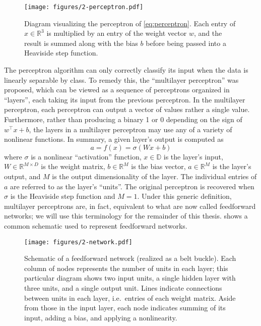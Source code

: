\begin{figure}
  \centering
  \texttt{[image: figures/2-perceptron.pdf]}
  \caption[Visualization of a perceptron]{Diagram visualizing the perceptron of \cref{eq:perceptron}.
  Each entry of $x \in \mathbb{R}^3$ is multiplied by an entry of the weight vector $w$, and the result is summed along with the bias $b$ before being passed into a Heaviside step function.}
  \label{fig:perceptron}
\end{figure}

The perceptron algorithm can only correctly classify its input when the data is linearly separable by class.
To remedy this, the ``multilayer perceptron'' was proposed, which can be viewed as a sequence of perceptrons organized in ``layers'', each taking its input from the previous perceptron.
In the multilayer perceptron, each perceptron can output a vector of values rather a single value.
Furthermore, rather than producing a binary 1 or 0 depending on the sign of $w^\top x + b$, the layers in a multilayer perceptron may use any of a variety of nonlinear functions.
In summary, a given layer's output is computed as
\begin{equation}
        a = f(x) = \sigma(W x + b)
\end{equation}
where $\sigma$ is a nonlinear ``activation'' function, $x \in \mathbb{D}$ is the layer's input, $W \in \mathbb{R}^{M \times D}$ is the weight matrix, $b \in \mathbb{R}^M$ is the bias vector, $a \in \mathbb{R}^M$ is the layer's output, and $M$ is the output dimensionality of the layer.
The individual entries of $a$ are referred to as the layer's ``units''.
The original perceptron is recovered when $\sigma$ is the Heaviside step function and $M = 1$.
Under this generic definition, multilayer perceptrons are, in fact, equivalent to what are now called feedforward networks; we will use this terminology for the remainder of this thesis.
 shows a common schematic used to represent feedforward networks.

\begin{figure}
  \centering
  \texttt{[image: figures/2-network.pdf]}
  \caption[Schematic of a feedforward network]{Schematic of a feedforward network (realized as a belt buckle).
  Each column of nodes represents the number of units in each layer; this particular diagram shows two input units, a single hidden layer with three units, and a single output unit.
  Lines indicate connections between units in each layer, i.e.\ entries of each weight matrix.
  Aside from those in the input layer, each node indicates summing of its input, adding a bias, and applying a nonlinearity.}
  \label{fig:network}
\end{figure}

